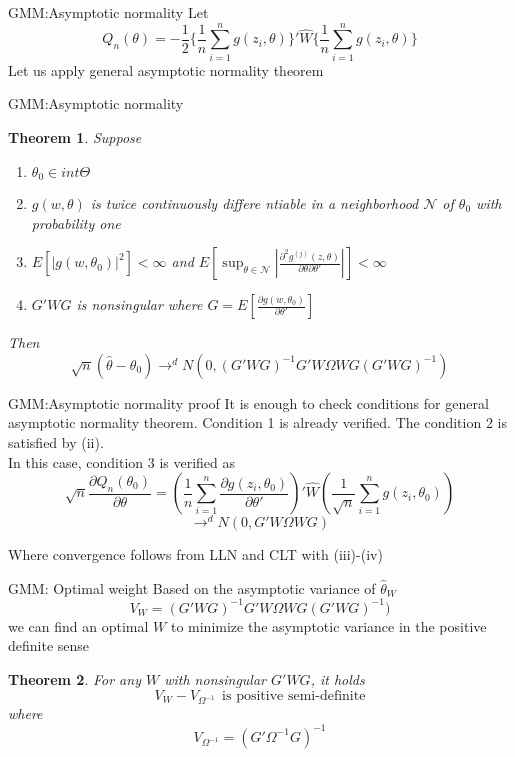 \documentclass{beamer}
\newtheorem{thm}{Theorem}[subsection]
\begin{document}
\begin{frame}{GMM:Asymptotic normality}
	Let
	\[Q_n(\theta) = -\frac{1}{2} \{\frac{1}{n} \sum^n_{i=1} g(z_i,\theta)\}' \hat{W} \{\frac{1}{n} \sum^n_{i=1} g(z_i,\theta)\}\]
	Let us apply general asymptotic normality theorem
\end{frame}
\begin{frame}{GMM:Asymptotic normality}
	\begin{thm}
		Suppose 
		\begin{enumerate}
				\item $\theta_0 \in int \Theta$
				\item $g(w, \theta)$ is twice continuously differe ntiable in a neighborhood $\mathcal{N}$ of $\theta_0$ with probability one
				\item $E[|g(w,\theta_0)|^2] < \infty$ and $E[\sup_{ \theta \in \mathcal{N}} | \frac{\partial^2 g^{(j)}(z,\theta)}{\partial \theta \partial \theta'}|] < \infty$
				\item $G'WG$ is nonsingular where $G = E[\frac{\partial g(w,\theta_0)}{\partial \theta'}]$
		\end{enumerate}
		Then
		\[\sqrt{n}(\hat{\theta} - \theta_0) \rightarrow^d N(0,(G'WG)^{-1} G'W\Omega WG(G'WG)^{-1})\]
	\end{thm}
\end{frame}
\begin{frame}{GMM:Asymptotic normality proof}
	It is enough to check conditions for general asymptotic normality theorem. Condition 1 is already verified. The condition 2 is satisfied by (ii).\\
	In this case, condition 3 is verified as 
	\[\sqrt{n} \frac{\partial Q_n(\theta_0)}{\partial \theta}  =(\frac{1}{n} \sum^n_{i=1} \frac{\partial g(z_i,\theta_0)}{\partial \theta'})' \hat{W} (\frac{1}{\sqrt{n}} \sum^n_{i=1} g(z_i,\theta_0))  \]
		\[\rightarrow^d N(0,G'W\Omega WG)\]

	Where convergence follows from LLN and CLT with (iii)-(iv)
\end{frame}
\begin{frame}{GMM: Optimal weight}
	Based on the asymptotic variance of $\hat{\theta}_W$
\[V_W = (G'WG)^{-1} G'W\Omega WG(G'WG)^{-1})\]
we can find an optimal $W$ to minimize the asymptotic variance in the positive definite sense
\begin{thm}
	For any $W$ with nonsingular $G'WG$, it holds 
	\[V_W - V_{\Omega^{-1}} \ \ \text{is positive semi-definite}\]
	where
	\[V_{\Omega^{-1}} = (G'\Omega^{-1}G)^{-1}\]
\end{thm}
\end{frame}
\end{document}
